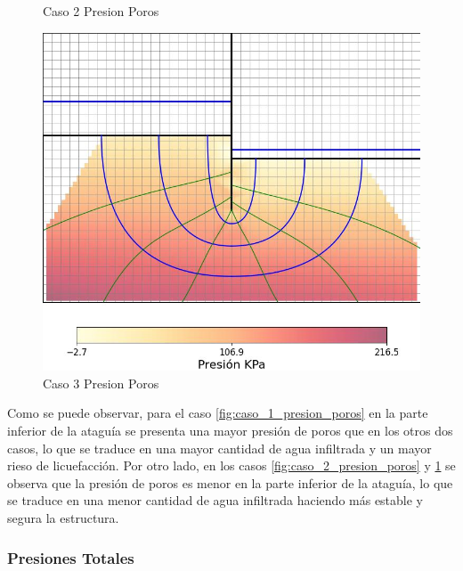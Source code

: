 \begin{figure}[H]
\begin{minipage}{0.32\textwidth}
        \caption{Caso 2 Presion Poros}
        \label{fig:caso_2_presion_poros}
    \end{minipage}
    \begin{minipage}{0.32\textwidth}
        \centering
        \includegraphics[width=\textwidth]{GRAFICOS/caso_3_presion_poros.jpg}
        \caption{Caso 3 Presion Poros}
        \label{fig:caso_3_presion_poros}
    \end{minipage}
\end{figure}

Como se puede observar, para el caso \ref{fig:caso_1_presion_poros} en la parte inferior de la ataguía se presenta una mayor presión de poros que en los otros dos casos, lo que se traduce en una mayor cantidad de agua infiltrada y un mayor rieso de licuefacción. Por otro lado, en los casos \ref{fig:caso_2_presion_poros} y \ref{fig:caso_3_presion_poros} se observa que la presión de poros es menor en la parte inferior de la ataguía, lo que se traduce en una menor cantidad de agua infiltrada haciendo más estable y segura la estructura.

\subsubsection{Presiones Totales}

